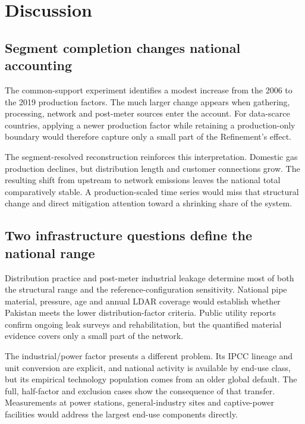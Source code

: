\section{Discussion}
\label{sec:discussion}

\subsection{Segment completion changes national accounting}

The common-support experiment identifies a modest increase from the 2006 to the 2019 production
factors. The much larger change appears when gathering, processing, network and post-meter
sources enter the account. For data-scarce countries, applying a newer production factor while
retaining a production-only boundary would therefore capture only a small part of the
Refinement's effect.

The segment-resolved reconstruction reinforces this interpretation. Domestic gas production declines,
but distribution length and customer connections grow. The resulting shift from upstream to
network emissions leaves the national total comparatively stable. A production-scaled time
series would miss that structural change and direct mitigation attention toward a shrinking
share of the system.

\subsection{Two infrastructure questions define the national range}

Distribution practice and post-meter industrial leakage determine most of both the structural
range and the reference-configuration sensitivity. National pipe material, pressure, age and
annual LDAR coverage would establish whether Pakistan meets the lower distribution-factor
criteria. Public utility reports confirm ongoing leak surveys and rehabilitation, but the
quantified material evidence covers only a small part of the network.

The industrial/power factor presents a different problem. Its IPCC lineage and unit conversion
are explicit, and national activity is available by end-use class, but its empirical technology
population comes from an older global default. The full, half-factor and exclusion cases show
the consequence of that transfer. Measurements at power stations, general-industry sites
and captive-power facilities would address the largest end-use components directly.

